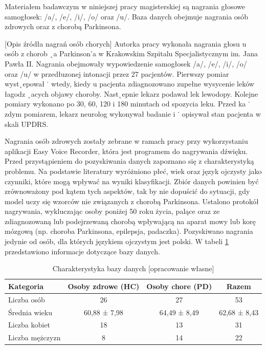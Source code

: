 Materiałem badawczym w niniejszej pracy magisterskiej są nagrania głosowe samogłosek: /a/,
/e/, /i/, /o/ oraz /u/.
Baza danych obejmuje nagrania osób zdrowych oraz z chorobą  Parkinsona.

[Opis źródła nagrań osób chorych]
Autorka pracy wykonała nagrania głosu u osób z chorob ˛a Parkinson’a w Krakowskim Szpitalu Specjalistycznym im. Jana Pawła II. Nagrania obejmowały wypowiedzenie samogłosek /a/,
/e/, /i/, /o/ oraz /u/ w przedłuzonej intonacji przez 27 pacjentów. Pierwszy pomiar wyst˛epował ˙
wtedy, kiedy u pacjenta zdiagnozowano zupełne wysycenie leków łagodz ˛acych objawy choroby. Nast˛epnie lekarz podawał lek lewodopy. Kolejne pomiary wykonano po 30, 60, 120 i 180
minutach od spozycia leku. Przed ka ˙ zdym pomiarem, lekarz neurolog wykonywał badanie i ˙
opisywał stan pacjenta w skali UPDRS.

Nagrania osób zdrowych zostały zebrane w ramach pracy przy wykorzystaniu aplikacji Easy
Voice Recorder, która jest programem do nagrywania dźwięku. Przed przystąpieniem do pozyskiwania
danych zapoznano się z charakterystyką problemu. Na podstawie literatury wyróżniono płeć, wiek oraz
język ojczysty jako czynniki, które mogą wpływać na wyniki klasyfikacji. Zbiór danych powinien być
zrównoważony pod kątem tych aspektów, tak by nie dopuścić do sytuacji, gdy model uczy się wzorców
nie związanych z chorobą Parkinsona.
Ustalono protokół nagrywania, wykluczając osoby poniżej 50 roku życia, palące oraz ze
zdiagnozowaną lub podejrzewaną chorobą wpływającą na aparat mowy lub korę mózgową (np.
choroba Parkinsona, epilepsja, padaczka).
Pozyskiwano nagrania jedynie od osób, dla których językiem ojczystym jest polski.
W tabeli \ref{tab:charakterystyka-bazy-danych} przedstawiono informacje dotyczące bazy danych.

\begin{table}[t]
\centering
\caption{Charakterystyka bazy danych [opracowanie własne]}
\label{tab:charakterystyka-bazy-danych}
\begin{tabular}{|l|c|c|c|}
\hline
\textbf{Kategoria} &\textbf{Osoby zdrowe (HC)} &\textbf{Osoby chore (PD)} &\textbf{Razem} \\ \hline
Liczba osób &26 &27 &53\\ \hline
Średnia wieku &60,88 ± 7,98 &64,49 ± 8,49  &62,68 ± 8,43\\ \hline
Liczba kobiet &18 &13 &31\\ \hline
Liczba mężczyzn &8 &14 &22 \\ \hline
\end{tabular}
\end{table}

